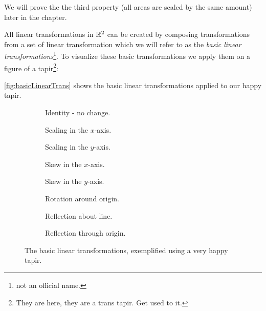 We will prove the the third property (all areas are scaled by the same amount) later in the chapter.

All linear transformations in $\mathbb{R}^{2}$ can be created by composing transformations from a set of linear transformation which we will refer to as the \emph{basic linear transformations}\footnote{not an official name.}. To visualize these basic transformations we apply them on a figure of a tapir\footnote{They are here, they are a trans tapir. Get used to it.}:

\begin{figure}[H]
	\centering
\end{figure}

\autoref{fig:basicLinearTrans} shows the basic linear transformations applied to our happy tapir.

\begin{figure}[H]
	\centering
	\begin{subfigure}[c]{0.29\textwidth}
		\centering
		\caption{Identity - no change.}
		\label{fig:}
	\end{subfigure}
	\begin{subfigure}[c]{0.37\textwidth}
		\centering
		\caption{Scaling in the $x$-axis.}
		\label{fig:}
	\end{subfigure}
	\begin{subfigure}[c]{0.29\textwidth}
		\centering
		\caption{Scaling in the $y$-axis.}
		\label{fig:}
	\end{subfigure}
	\hfill
	\begin{subfigure}[c]{0.3\textwidth}
		\centering
		\caption{Skew in the $x$-axis.}
		\label{fig:}
	\end{subfigure}
	\begin{subfigure}[c]{0.3\textwidth}
		\centering
		\caption{Skew in the $y$-axis.}
		\label{fig:}
	\end{subfigure}
	\begin{subfigure}[c]{0.35\textwidth}
		\centering
		\caption{Rotation around origin.}
		\label{fig:}
	\end{subfigure}
	\hfill
	\begin{subfigure}[c]{0.3\textwidth}
		\centering
		\caption{Reflection about line.}
		\label{fig:}
	\end{subfigure}
	\begin{subfigure}[c]{0.3\textwidth}
		\centering
		\caption{Reflection through origin.}
		\label{fig:}
	\end{subfigure}
	\caption{The basic linear transformations, exemplified using a very happy tapir.}
	\label{fig:basicLinearTrans}
\end{figure}

